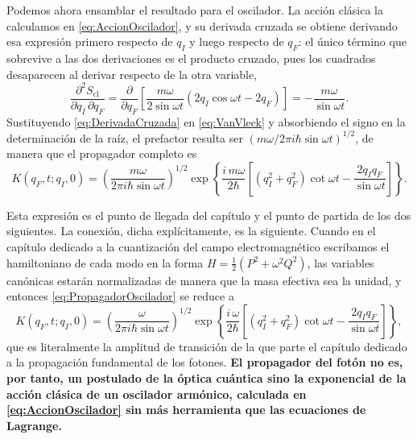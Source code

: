         Podemos ahora ensamblar el resultado para el oscilador. La acción clásica la calculamos en \eqref{eq:AccionOscilador}, y su derivada cruzada se obtiene derivando esa expresión primero respecto de $q_{I}$ y luego respecto de $q_{F}$: el único término que sobrevive a las dos derivaciones es el producto cruzado, pues los cuadrados desaparecen al derivar respecto de la otra variable,
        \begin{equation}\label{eq:DerivadaCruzada}
            \frac{\partial^{2}S_{\mathrm{cl}}}{\partial q_{I}\,\partial q_{F}}
            = \frac{\partial}{\partial q_{F}}\left[\frac{m\omega}{2\sin\omega t}\left(2q_{I}\cos\omega t - 2q_{F}\right)\right]
            = -\frac{m\omega}{\sin\omega t} .
        \end{equation}
        Sustituyendo \eqref{eq:DerivadaCruzada} en \eqref{eq:VanVleck} y absorbiendo el signo en la determinación de la raíz, el prefactor resulta ser $\left(m\omega/2\pi i\hbar\sin\omega t\right)^{1/2}$, de manera que el propagador completo es
        \begin{equation}\label{eq:PropagadorOscilador}
            \boxed{\;K(q_{F},t;q_{I},0) = \left(\frac{m\omega}{2\pi i\hbar\sin\omega t}\right)^{1/2}
            \exp\left\{\frac{i\,m\omega}{2\hbar}\left[\left(q_{I}^{2}+q_{F}^{2}\right)\cot\omega t - \frac{2q_{I}q_{F}}{\sin\omega t}\right]\right\} .\;}
        \end{equation}

        Esta expresión es el punto de llegada del capítulo y el punto de partida de los dos siguientes. La conexión, dicha explícitamente, es la siguiente. Cuando en el capítulo dedicado a la cuantización del campo electromagnético escribamos el hamiltoniano de cada modo en la forma $H = \frac{1}{2}\left(P^{2}+\omega^{2}Q^{2}\right)$, las variables canónicas estarán normalizadas de manera que la masa efectiva sea la unidad, y entonces \eqref{eq:PropagadorOscilador} se reduce a
        \begin{equation}\label{eq:PropagadorFoton}
            K(q_{F},t;q_{I},0) = \left(\frac{\omega}{2\pi i\hbar\sin\omega t}\right)^{1/2}
            \exp\left\{\frac{i\,\omega}{2\hbar}\left[\left(q_{I}^{2}+q_{F}^{2}\right)\cot\omega t - \frac{2q_{I}q_{F}}{\sin\omega t}\right]\right\},
        \end{equation}
        que es literalmente la amplitud de transición de la que parte el capítulo dedicado a la propagación fundamental de los fotones. \textbf{El propagador del fotón no es, por tanto, un postulado de la óptica cuántica sino la exponencial de la acción clásica de un oscilador armónico, calculada en \eqref{eq:AccionOscilador} sin más herramienta que las ecuaciones de Lagrange.}

